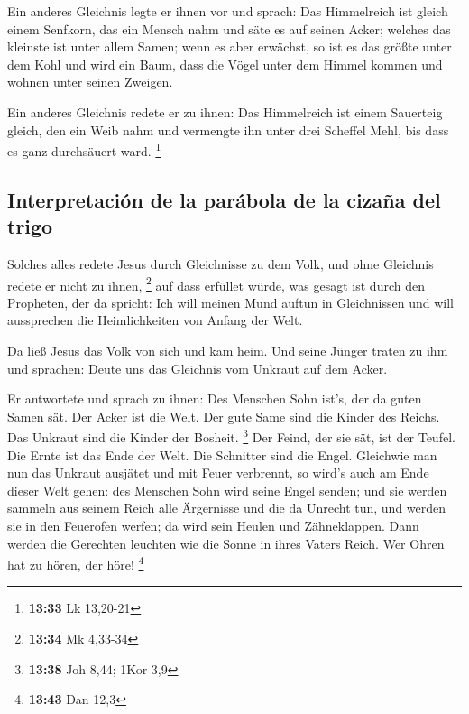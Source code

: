  Ein anderes Gleichnis legte er ihnen vor und sprach: Das
Himmelreich ist gleich einem Senfkorn, das ein Mensch nahm und säte es
auf seinen Acker;  welches das kleinste ist unter allem
Samen; wenn es aber erwächst, so ist es das größte unter dem Kohl und
wird ein Baum, dass die Vögel unter dem Himmel kommen und wohnen unter
seinen Zweigen.

 Ein anderes Gleichnis redete er zu ihnen: Das
Himmelreich ist einem Sauerteig gleich, den ein Weib nahm und vermengte
ihn unter drei Scheffel Mehl, bis dass es ganz durchsäuert ward.
\footnote{\textbf{13:33} Lk 13,20-21}

\hypertarget{interpretaciuxf3n-de-la-paruxe1bola-de-la-cizauxf1a-del-trigo}{%
\subsection{Interpretación de la parábola de la cizaña del
trigo}\label{interpretaciuxf3n-de-la-paruxe1bola-de-la-cizauxf1a-del-trigo}}

 Solches alles redete Jesus durch Gleichnisse zu dem
Volk, und ohne Gleichnis redete er nicht zu ihnen, \footnote{\textbf{13:34}
  Mk 4,33-34}  auf dass erfüllet würde, was gesagt ist
durch den Propheten, der da spricht: Ich will meinen Mund auftun in
Gleichnissen und will aussprechen die Heimlichkeiten von Anfang der
Welt.

 Da ließ Jesus das Volk von sich und kam heim. Und seine
Jünger traten zu ihm und sprachen: Deute uns das Gleichnis vom Unkraut
auf dem Acker.

 Er antwortete und sprach zu ihnen: Des Menschen Sohn
ist's, der da guten Samen sät.  Der Acker ist die Welt.
Der gute Same sind die Kinder des Reichs. Das Unkraut sind die Kinder
der Bosheit. \footnote{\textbf{13:38} Joh 8,44; 1Kor 3,9}
 Der Feind, der sie sät, ist der Teufel. Die Ernte ist
das Ende der Welt. Die Schnitter sind die Engel. 
Gleichwie man nun das Unkraut ausjätet und mit Feuer verbrennt, so
wird's auch am Ende dieser Welt gehen:  des Menschen Sohn
wird seine Engel senden; und sie werden sammeln aus seinem Reich alle
Ärgernisse und die da Unrecht tun,  und werden sie in den
Feuerofen werfen; da wird sein Heulen und Zähneklappen. 
Dann werden die Gerechten leuchten wie die Sonne in ihres Vaters Reich.
Wer Ohren hat zu hören, der höre! \footnote{\textbf{13:43} Dan 12,3}

